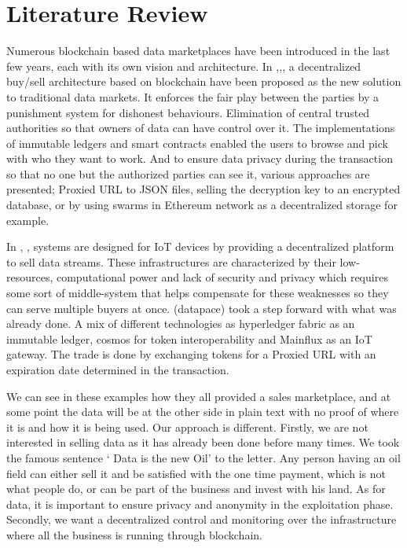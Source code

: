 \documentclass[conference]{IEEEtran}
\begin{document}
\section{Literature Review}
Numerous blockchain based data marketplaces have been introduced in the last few years, each with its own vision and architecture. In \cite{DBLP:journals/corr/abs-1812-09966},\cite{ozyilmaz2018idmob},\cite{yoo2020blockchain},\cite{DBLP:journals/corr/abs-1811-11462} a decentralized buy/sell architecture based on blockchain have been proposed as the new solution to traditional data markets. It enforces the fair play between the parties by a punishment system for dishonest behaviours. Elimination of central trusted authorities so that owners of data can have control over it. The implementations of immutable ledgers and smart contracts enabled the users to browse and pick with who they want to work. And to ensure data privacy during the transaction so that no one but the authorized parties can see it, various approaches are presented; Proxied URL to JSON files, selling the decryption key to an encrypted database, or by using swarms in Ethereum network as a decentralized storage for example.

In  \cite{inproceedings}, \cite{suliman2019monetization},\cite{7765669} systems are designed for IoT devices by providing a decentralized platform to sell data streams. These infrastructures are characterized by their low-resources, computational power and lack of security and privacy which requires some sort of middle-system that helps compensate for these weaknesses so they can serve multiple buyers at once.
(datapace) took a step forward with what was already done. A mix of different technologies as hyperledger fabric as an immutable ledger, cosmos for token interoperability and Mainflux as an IoT gateway. The trade is done by exchanging tokens for a Proxied URL with an expiration date determined in the transaction.

We can see in these  examples how they all provided a sales marketplace, and at some point the data will be at the other side in plain text with no proof of where it is and how it is being used.
Our approach is different. Firstly, we are not interested in selling data as it has already been done before many times. We took the famous sentence ‘ Data is the new Oil’ to the letter. Any person having an oil field can either sell it and be satisfied with the one time payment, which is not what people do, or can be part of the business and invest with his land. As for data, it is important to ensure privacy and anonymity in the exploitation phase. Secondly, we want a decentralized control and monitoring over the infrastructure where all the business is running through blockchain.
\end{document}
